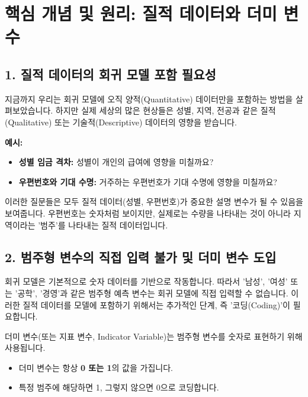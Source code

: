 \documentclass[11pt,a4paper]{article}
\begin{document}
\newpage
\section*{핵심 개념 및 원리: 질적 데이터와 더미 변수}

\subsection*{1. 질적 데이터의 회귀 모델 포함 필요성}
지금까지 우리는 회귀 모델에 오직 양적(Quantitative) 데이터만을 포함하는 방법을 살펴보았습니다. 하지만 실제 세상의 많은 현상들은 성별, 지역, 전공과 같은 질적(Qualitative) 또는 기술적(Descriptive) 데이터의 영향을 받습니다.

\begin{examplebox}
\textbf{예시:}
\begin{itemize}
    \item \textbf{성별 임금 격차:} 성별이 개인의 급여에 영향을 미칠까요?
    \item \textbf{우편번호와 기대 수명:} 거주하는 우편번호가 기대 수명에 영향을 미칠까요?
\end{itemize}
이러한 질문들은 모두 질적 데이터(성별, 우편번호)가 중요한 설명 변수가 될 수 있음을 보여줍니다. 우편번호는 숫자처럼 보이지만, 실제로는 수량을 나타내는 것이 아니라 지역이라는 '범주'를 나타내는 질적 데이터입니다.
\end{examplebox}

\subsection*{2. 범주형 변수의 직접 입력 불가 및 더미 변수 도입}
회귀 모델은 기본적으로 숫자 데이터를 기반으로 작동합니다. 따라서 '남성', '여성' 또는 '공학', '경영'과 같은 범주형 예측 변수는 회귀 모델에 직접 입력할 수 없습니다. 이러한 질적 데이터를 모델에 포함하기 위해서는 추가적인 단계, 즉 '코딩(Coding)'이 필요합니다.

\begin{tcolorbox}[title=더미 변수(Dummy Variable)의 정의]
더미 변수(또는 지표 변수, Indicator Variable)는 범주형 변수를 숫자로 표현하기 위해 사용됩니다.
\begin{itemize}
    \item 더미 변수는 항상 \textbf{0 또는 1}의 값을 가집니다.
    \item 특정 범주에 해당하면 1, 그렇지 않으면 0으로 코딩합니다.
\end{itemize}
\end{tcolorbox}
\end{document}
